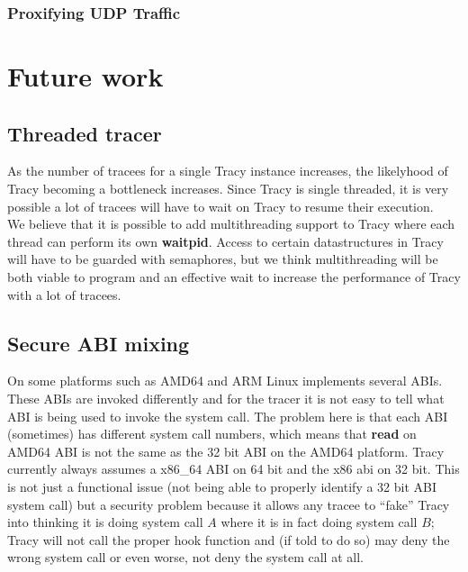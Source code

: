 \documentclass[a4paper, 10pt]{report}
\begin{document}
\subsection{Proxifying UDP Traffic}

\chapter{Future work}

\section{Threaded tracer}

As the number of tracees for a single Tracy instance increases, the
likelyhood of Tracy becoming a bottleneck increases. Since Tracy is
single threaded, it is very possible a lot of tracees will have to wait
on Tracy to resume their execution. \\

We believe that it is possible to add multithreading support to Tracy where
each thread can perform its own \textbf{waitpid}. Access to certain
datastructures in Tracy will have to be guarded with semaphores, but
we think multithreading will be both viable to program and an effective
wait to increase the performance of Tracy with a lot of tracees.


\section{Secure ABI mixing}
\label{secure-abi}

On some platforms such as AMD64 and ARM Linux implements several ABIs.
These ABIs are invoked differently and for the tracer it is not easy to
tell what ABI is being used to invoke the system call.
The problem here is that each ABI (sometimes) has different system call
numbers, which means that \textbf{read} on AMD64 ABI is not the same
as the 32 bit ABI on the AMD64 platform. Tracy currently always assumes
a x86\_64 ABI on 64 bit and the x86 abi on 32 bit.
This is not just a functional issue (not being able to properly identify a 32
bit ABI system call) but a security problem because it
allows any tracee to ``fake'' Tracy into thinking it is doing system call $A$
where it is in fact doing system call $B$; Tracy will not call the proper hook
function and (if told to do so) may deny the wrong system call or even worse,
not deny the system call at all. \\
\end{document}
